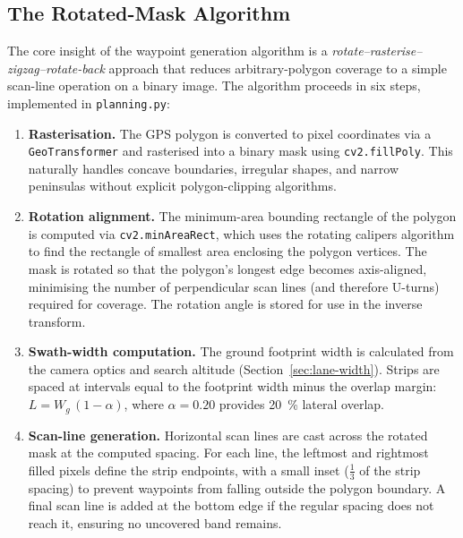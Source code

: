 \subsection{The Rotated-Mask Algorithm}\label{sec:algorithm}

The core insight of the waypoint generation algorithm is a \emph{rotate--rasterise--zigzag--rotate-back} approach that reduces arbitrary-polygon coverage to a simple scan-line operation on a binary image. The algorithm proceeds in six steps, implemented in \texttt{planning.py}:

\begin{enumerate}
  \item \textbf{Rasterisation.} The GPS polygon is converted to pixel coordinates via a \texttt{GeoTransformer} and rasterised into a binary mask using \texttt{cv2.fillPoly}. This naturally handles concave boundaries, irregular shapes, and narrow peninsulas without explicit polygon-clipping algorithms.

  \item \textbf{Rotation alignment.} The minimum-area bounding rectangle of the polygon is computed via \texttt{cv2.minAreaRect}, which uses the rotating calipers algorithm to find the rectangle of smallest area enclosing the polygon vertices. The mask is rotated so that the polygon's longest edge becomes axis-aligned, minimising the number of perpendicular scan lines (and therefore U-turns) required for coverage. The rotation angle is stored for use in the inverse transform.

  \item \textbf{Swath-width computation.} The ground footprint width is calculated from the camera optics and search altitude (Section~\ref{sec:lane-width}). Strips are spaced at intervals equal to the footprint width minus the overlap margin: $L = W_g \,(1 - \alpha)$, where $\alpha = 0.20$ provides \SI{20}{\percent} lateral overlap.

  \item \textbf{Scan-line generation.} Horizontal scan lines are cast across the rotated mask at the computed spacing. For each line, the leftmost and rightmost filled pixels define the strip endpoints, with a small inset ($\tfrac{1}{3}$ of the strip spacing) to prevent waypoints from falling outside the polygon boundary. A final scan line is added at the bottom edge if the regular spacing does not reach it, ensuring no uncovered band remains.


\end{enumerate}
